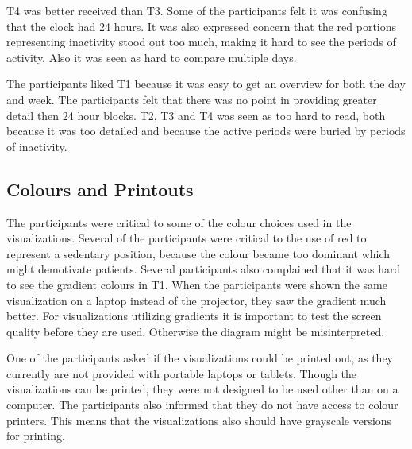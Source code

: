 T4 was better received than T3. Some of the participants felt it was confusing that the clock had 24 hours. It was also expressed concern that the red portions representing inactivity stood out too much, making it hard to see the periods of activity. Also it was seen as hard to compare multiple days.

The participants liked T1 because it was easy to get an overview for both the day and week. The participants felt that there was no point in providing greater detail then 24 hour blocks. T2, T3 and T4 was seen as too hard to read, both because it was too detailed and because the active periods were buried by periods of inactivity.

\subsection{Colours and Printouts}
The participants were critical to some of the colour choices used in the visualizations. Several of the participants were critical to the use of red to represent a sedentary position, because the colour became too dominant which might demotivate patients. Several participants also complained that it was hard to see the gradient colours in T1. When the participants were shown the same visualization on a laptop instead of the projector, they saw the gradient much better. For visualizations utilizing gradients it is important to test the screen quality before they are used. Otherwise the diagram might be misinterpreted. 

One of the participants asked if the visualizations could be printed out, as they currently are not provided with portable laptops or tablets. Though the visualizations can be printed, they were not designed to be used other than on a computer. The participants also informed that they do not have access to colour printers. This means that the visualizations also should have grayscale versions for printing. 
